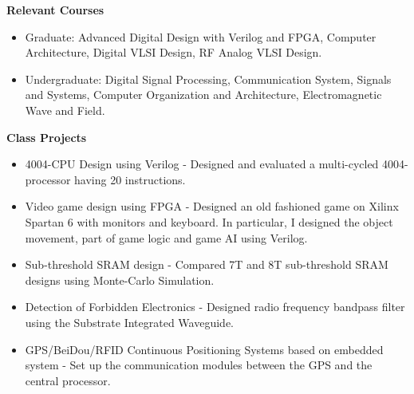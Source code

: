 \documentclass[]{article}
\begin{document}
\noindent \textbf{Relevant Courses}
\begin{itemize}
\item Graduate:
                    Advanced Digital Design with Verilog and FPGA, Computer
                    Architecture, Digital VLSI Design,
                    RF Analog VLSI Design. 
\item Undergraduate:
                    Digital Signal Processing, Communication System, Signals
                    and Systems, Computer Organization and 
                    Architecture, Electromagnetic Wave and Field. 
\end{itemize}


\noindent \textbf{Class Projects}
\begin{itemize}
\item 4004-CPU Design using Verilog - 
Designed and evaluated a multi-cycled 4004-processor having 20 instructions.

\item Video game design using FPGA - 
Designed an old fashioned game on Xilinx Spartan 6 with monitors and keyboard.
In particular, I designed the object movement, part of game logic and game AI
using Verilog.

\item Sub-threshold SRAM design - 
Compared 7T and 8T sub-threshold SRAM designs using Monte-Carlo Simulation.
	
\item Detection of Forbidden Electronics -
Designed radio frequency bandpass filter using the Substrate Integrated
Waveguide.

\item GPS/BeiDou/RFID Continuous Positioning Systems based on embedded system -
Set up the communication modules between the GPS and the central processor.

\end{itemize}
\end{document}
